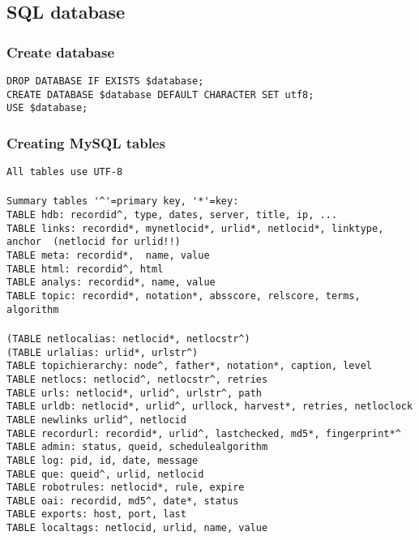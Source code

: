 \subsection{SQL database}
\label{sqlstruct}
\subsubsection{Create database}
\verb+DROP DATABASE IF EXISTS $database;+\\
\verb+CREATE DATABASE $database DEFAULT CHARACTER SET utf8;+\\
\verb+USE $database;+\\
\subsubsection{Creating MySQL tables}
\verb+All tables use UTF-8+\\
\verb++\\
\verb+Summary tables '^'=primary key, '*'=key:+\\
\verb+TABLE hdb: recordid^, type, dates, server, title, ip, ...+\\
\verb+TABLE links: recordid*, mynetlocid*, urlid*, netlocid*, linktype, anchor  (netlocid for urlid!!)+\\
\verb+TABLE meta: recordid*,  name, value+\\
\verb+TABLE html: recordid^, html+\\
\verb+TABLE analys: recordid*, name, value+\\
\verb+TABLE topic: recordid*, notation*, absscore, relscore, terms, algorithm+\\
\verb++\\
\verb+(TABLE netlocalias: netlocid*, netlocstr^)+\\
\verb+(TABLE urlalias: urlid*, urlstr^)+\\
\verb+TABLE topichierarchy: node^, father*, notation*, caption, level+\\
\verb+TABLE netlocs: netlocid^, netlocstr^, retries+\\
\verb+TABLE urls: netlocid*, urlid^, urlstr^, path+\\
\verb+TABLE urldb: netlocid*, urlid^, urllock, harvest*, retries, netloclock+\\
\verb+TABLE newlinks urlid^, netlocid+\\
\verb+TABLE recordurl: recordid*, urlid^, lastchecked, md5*, fingerprint*^+\\
\verb+TABLE admin: status, queid, schedulealgorithm+\\
\verb+TABLE log: pid, id, date, message+\\
\verb+TABLE que: queid^, urlid, netlocid+\\
\verb+TABLE robotrules: netlocid*, rule, expire+\\
\verb+TABLE oai: recordid, md5^, date*, status+\\
\verb+TABLE exports: host, port, last+\\
\verb+TABLE localtags: netlocid, urlid, name, value+\\
